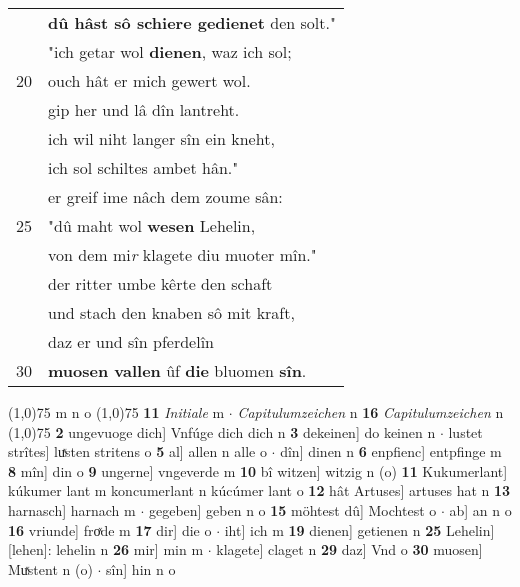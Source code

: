 \documentclass[8pt,a4paper,notitlepage]{article}
\begin{document}
\begin{table}[ht]
\begin{minipage}[t]{0.5\linewidth}
\begin{tabular}{rl}
 & \textbf{dû hâst sô schiere gedienet} den solt."\\ 
 & "ich getar wol \textbf{dienen}, waz ich sol;\\ 
20 & ouch hât er mich gewert wol.\\ 
 & gip her und lâ dîn lantreht.\\ 
 & ich wil niht langer sîn ein kneht,\\ 
 & ich sol schiltes ambet hân."\\ 
 & er greif ime nâch dem zoume sân:\\ 
25 & "dû maht wol \textbf{wesen} Lehelin,\\ 
 & von dem mi\textit{r} klagete diu muoter mîn."\\ 
 & der ritter umbe kêrte den schaft\\ 
 & und stach den knaben sô mit kraft,\\ 
 & daz er und sîn pferdelîn\\ 
30 & \textbf{muosen vallen} ûf \textbf{die} bluomen \textbf{sîn}.\\ 
\end{tabular}
\scriptsize
\line(1,0){75} \newline
m n o \newline
\line(1,0){75} \newline
\textbf{11} \textit{Initiale} m   $\cdot$ \textit{Capitulumzeichen} n  \textbf{16} \textit{Capitulumzeichen} n  \newline
\line(1,0){75} \newline
\textbf{2} ungevuoge dich] Vnfúge dich dich n \textbf{3} dekeinen] do keinen n  $\cdot$ lustet strîtes] luͯsten stritens o \textbf{5} al] allen n alle o  $\cdot$ dîn] dinen n \textbf{6} enpfienc] entpfinge m \textbf{8} mîn] din o \textbf{9} ungerne] vngeverde m \textbf{10} bî witzen] witzig n (o) \textbf{11} Kukumerlant] kúkumer lant m koncumerlant n kúcúmer lant o \textbf{12} hât Artuses] artuses hat n \textbf{13} harnasch] harnach m  $\cdot$ gegeben] geben n o \textbf{15} möhtest dû] Mochtest o  $\cdot$ ab] an n o \textbf{16} vriunde] froͯde m \textbf{17} dir] die o  $\cdot$ iht] ich m \textbf{19} dienen] getienen n \textbf{25} Lehelin] [lehen]: lehelin n \textbf{26} mir] min m  $\cdot$ klagete] claget n \textbf{29} daz] Vnd o \textbf{30} muosen] Muͯstent n (o)  $\cdot$ sîn] hin n o \newline
\end{minipage}
\end{table}
\newpage
\end{document}

